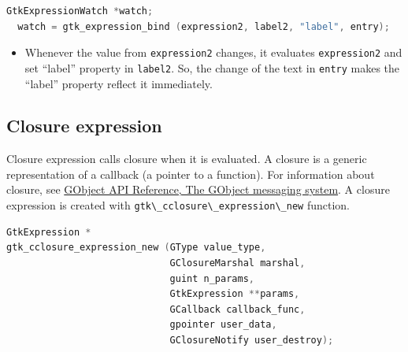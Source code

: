 \begin{lstlisting}[language=C]
  GtkExpressionWatch *watch;
  watch = gtk_expression_bind (expression2, label2, "label", entry);
\end{lstlisting}

\begin{itemize}
\tightlist
\item
  Whenever the value from \passthrough{\lstinline!expression2!} changes,
  it evaluates \passthrough{\lstinline!expression2!} and set ``label''
  property in \passthrough{\lstinline!label2!}. So, the change of the
  text in \passthrough{\lstinline!entry!} makes the ``label'' property
  reflect it immediately.
\end{itemize}

\hypertarget{closure-expression}{%
\subsection{Closure expression}\label{closure-expression}}

Closure expression calls closure when it is evaluated. A closure is a
generic representation of a callback (a pointer to a function). For
information about closure, see
\href{https://docs.gtk.org/gobject/concepts.html\#the-gobject-messaging-system}{GObject
API Reference, The GObject messaging system}. A closure expression is
created with \passthrough{\lstinline!gtk\_cclosure\_expression\_new!}
function.

\begin{lstlisting}[language=C]
GtkExpression *
gtk_cclosure_expression_new (GType value_type,
                             GClosureMarshal marshal,
                             guint n_params,
                             GtkExpression **params,
                             GCallback callback_func,
                             gpointer user_data,
                             GClosureNotify user_destroy);
\end{lstlisting}

